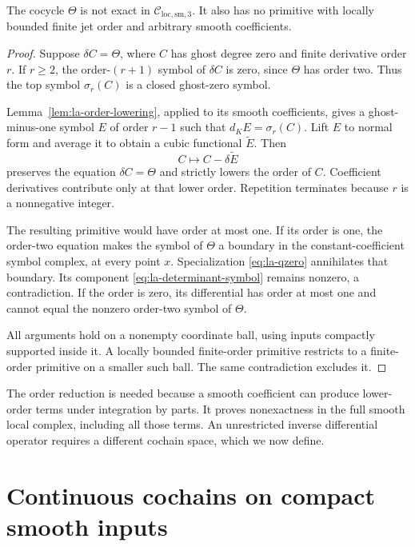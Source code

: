 \begin{theorem}\label{thm:la-smooth-nonexact}
The cocycle $\Theta$ is not exact in
$\mathcal C_{\mathrm{loc,sm},3}$.
It also has no primitive with locally bounded finite jet order
and arbitrary smooth coefficients.
\end{theorem}
\begin{proof}
Suppose $\delta C=\Theta$, where $C$ has ghost degree zero and
finite derivative order $r$. If $r\geq2$, the order-$(r+1)$
symbol of $\delta C$ is zero, since $\Theta$ has order two.
Thus the top symbol $\sigma_r(C)$ is a closed ghost-zero
symbol.

Lemma~\ref{lem:la-order-lowering}, applied to its smooth
coefficients, gives a ghost-minus-one symbol $E$ of order
$r-1$ such that $d_KE=\sigma_r(C)$. Lift $E$ to normal form
and average it to obtain a cubic functional $\widetilde E$.
Then
\[
 C\longmapsto C-\delta\widetilde E
\]
preserves the equation $\delta C=\Theta$ and strictly lowers
the order of $C$. Coefficient derivatives contribute only at
that lower order. Repetition terminates because $r$ is a
nonnegative integer.

The resulting primitive would have order at most one. If its
order is one, the order-two equation makes the symbol of
$\Theta$ a boundary in the constant-coefficient symbol
complex, at every point $x$. Specialization
\eqref{eq:la-qzero} annihilates that boundary. Its component
\eqref{eq:la-determinant-symbol} remains nonzero, a
contradiction. If the order is zero, its differential has
order at most one and cannot equal the nonzero order-two
symbol of $\Theta$.

All arguments hold on a nonempty coordinate ball, using
inputs compactly supported inside it. A locally bounded
finite-order primitive restricts to a finite-order primitive
on a smaller such ball. The same contradiction excludes it.
\end{proof}

The order reduction is needed because a smooth coefficient can
produce lower-order terms under integration by parts. It proves
nonexactness in the full smooth local complex, including all
those terms. An unrestricted inverse differential operator
requires a different cochain space, which we now define.

\section{Continuous cochains on compact smooth inputs}
\label{sec:la-continuous}

